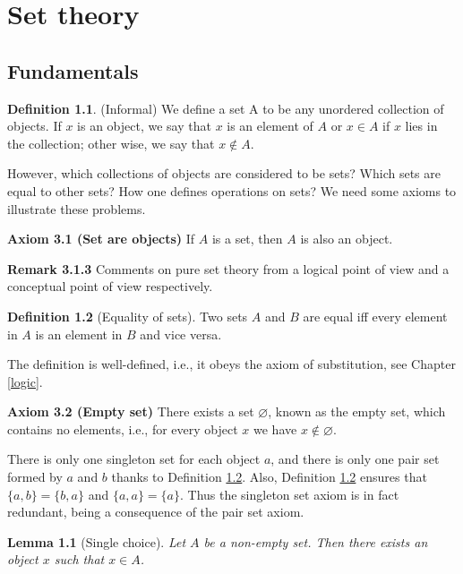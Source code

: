 \documentclass[
]{book}
\newtheorem{lemma}{Lemma}[chapter]
\theoremstyle{definition}
\newtheorem{definition}{Definition}[chapter]
\theoremstyle{definition}
\theoremstyle{definition}
\theoremstyle{definition}
\theoremstyle{remark}
\begin{document}
\chapter{Set theory}\label{set}

\section{Fundamentals}\label{fundamentals}

\begin{definition}
(Informal) We define a set A to be any unordered collection of objects. If \(x\) is an object, we say that \(x\) is an element of \(A\) or \(x\in A\) if \(x\) lies in the collection; other wise, we say that \(x \not\in A\).
\end{definition}

However, which collections of objects are considered to be sets? Which sets are equal to other sets? How one defines operations on sets? We need some axioms to illustrate these problems.

\textbf{Axiom 3.1 (Set are objects)} If \(A\) is a set, then \(A\) is also an object.

\textbf{Remark 3.1.3} Comments on pure set theory from a logical point of view and a conceptual point of view respectively.

\begin{definition}[Equality of sets]
\protect\hypertarget{def:eq}{}\label{def:eq}Two sets \(A\) and \(B\) are equal iff every element in \(A\) is an element in \(B\) and vice versa.
\end{definition}

The definition is well-defined, i.e., it obeys the axiom of substitution, see Chapter \ref{logic}.

\textbf{Axiom 3.2 (Empty set)} There exists a set \(\varnothing\), known as the empty set, which contains no elements, i.e., for every object \(x\) we have \(x \not\in \varnothing\).

There is only one singleton set for each object \(a\), and there is only one pair set formed by \(a\) and \(b\) thanks to Definition \ref{def:eq}. Also, Definition \ref{def:eq} ensures that \(\{a,b\} = \{b,a\}\) and \(\{a,a\} = \{a\}\). Thus the singleton set axiom is in fact redundant, being a consequence of the pair set axiom.

\begin{lemma}[Single choice]
Let \(A\) be a non-empty set. Then there exists an object \(x\) such that \(x\in A\).
\end{lemma}
\end{document}

